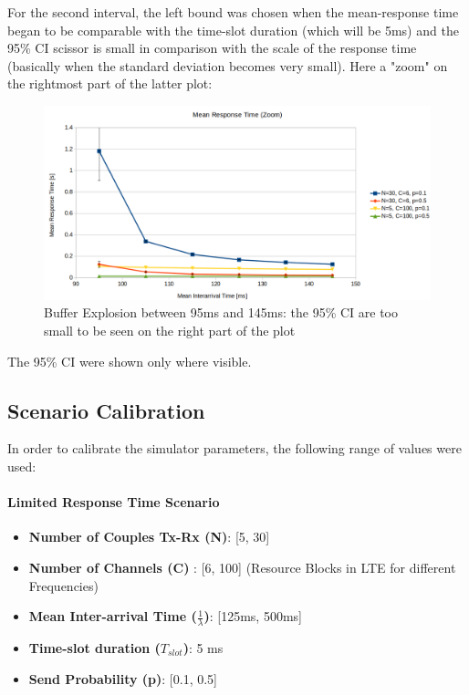 For the second interval, the left bound was chosen when the mean-response time began to be comparable with the time-slot duration (which will be 5ms) and the 95\% CI scissor is small in comparison with the scale of the response time (basically when the standard deviation becomes very small). Here a "zoom" on the rightmost part of the latter plot:
\begin{figure}[H]
	\centering
	\includegraphics[width=\textwidth]{img/BufferExplosionZoom.png}
	\caption{Buffer Explosion between 95ms and 145ms: the 95\% CI are too small to be seen on the right part of the plot}
	\label {img: bufferExplosion}
\end{figure}

\noindent The 95\% CI were shown only where visible. 
\subsection{Scenario Calibration}
In order to calibrate the simulator parameters, the following range of values were used:

\paragraph{Limited Response Time Scenario}
\begin{itemize}
	\item \textbf{Number of Couples Tx-Rx (N)}: [5, 30]
	\item \textbf{Number of Channels (C)} : [6, 100] (Resource Blocks in LTE for different Frequencies)
	\item \textbf{Mean Inter-arrival Time ($\frac{1}{\lambda}$)}: [125ms, 500ms]  
	\item \textbf{Time-slot duration ($T_{slot}$)}: 5 ms
	\item \textbf{Send Probability (p)}: [0.1, 0.5] 
\end{itemize}

